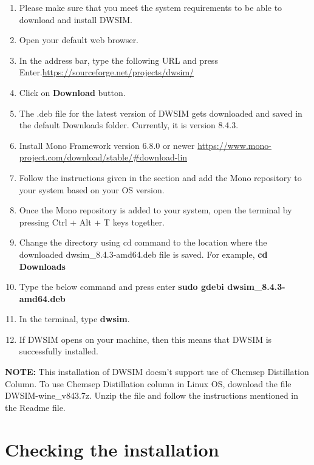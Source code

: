 \documentclass[a4paper,12pt]{article}
\begin{document}
\begin{enumerate}
\item Please make sure that you meet the system requirements to be able to download and install DWSIM.
\item Open your default web browser.
\item In the address bar, type the following URL and press Enter.\newline \url{https://sourceforge.net/projects/dwsim/}
\item Click on \textbf{Download} button.
\item The .deb file for the latest version of DWSIM gets downloaded and saved in the default Downloads folder. Currently, it is version 8.4.3.
\item Install Mono Framework version 6.8.0 or newer
\newline \url{https://www.mono-project.com/download/stable/#download-lin}
\item Follow the instructions given in the section and add the Mono repository to your system based on your OS version. 
\item Once the Mono repository is added to your system, open the terminal by pressing Ctrl + Alt + T keys together.
\item Change the directory using cd command to the location where the downloaded dwsim\_8.4.3-amd64.deb file is saved. For example, \textbf{cd Downloads}
\item Type the below command and press enter
\newline \textbf{sudo gdebi dwsim\_8.4.3-amd64.deb}
\item In the terminal, type \textbf{dwsim}.
\item If DWSIM opens on your machine, then this means that DWSIM is successfully installed.

\end{enumerate}

\noindent \textbf{NOTE:} This installation of DWSIM doesn't support use of Chemsep Distillation Column. To use Chemsep Distillation column in Linux OS, download the file DWSIM-wine\_v843.7z. Unzip the file and follow the instructions mentioned in the Readme file.

\section{Checking the installation}
\end{document}
